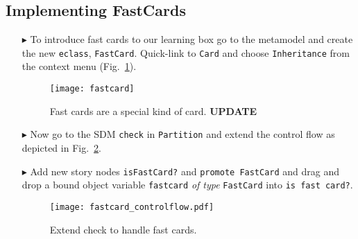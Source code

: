 \newpage
\subsection{Implementing FastCards}
\visHeader
\hypertarget{fastCard vis}{}

\begin{itemize}

\item[$\blacktriangleright$] To introduce fast cards to our learning box go to the metamodel and create the new \texttt{eclass}, \texttt{FastCard}. Quick-link
to \texttt{Card} and choose \texttt{Inheritance} from the context menu (Fig.~\ref{fig:sdm_fastcard_1}).

\begin{figure}[htp]
\begin{center}
  \texttt{[image: fastcard]}
  \caption{Fast cards are a special kind of card. {\bf UPDATE}}  
  \label{fig:sdm_fastcard_1}
\end{center}
\end{figure}

\item[$\blacktriangleright$] Now go to the SDM \texttt{check} in \texttt{Partition} and extend the control flow as depicted in Fig.~\ref{fig:sdm_fastcard_2}.
 
\item[$\blacktriangleright$] Add new story nodes \texttt{isFastCard?} and \texttt{promote FastCard} and drag and drop a bound object variable
\texttt{fastcard} \emph{of type} \texttt{FastCard} into \texttt{is fast card?}.

\begin{figure}[htbp]
\begin{center}
  \texttt{[image: fastcard\_controlflow.pdf]}
  \caption{Extend check to handle fast cards.}  
  \label{fig:sdm_fastcard_2}
\end{center}
\end{figure}

\end{itemize}



